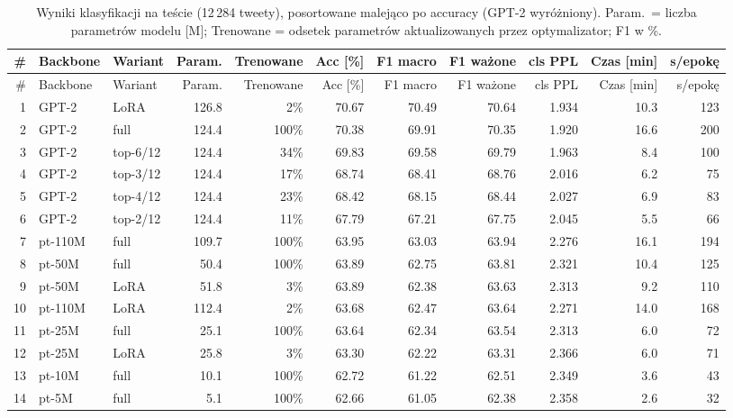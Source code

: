 {\footnotesize\setlength{\tabcolsep}{3.5pt}\setlength{\LTcapwidth}{\linewidth}
\begin{longtable}{@{}rllrrrrrrrr@{}}
\caption{Wyniki klasyfikacji na teście (12\,284 tweety), posortowane malejąco po accuracy (GPT-2 wyróżniony). Param.\ = liczba parametrów modelu [M]; Trenowane = odsetek parametrów aktualizowanych przez optymalizator; F1 w \%.}\label{tab:results}\\
\toprule
\# & Backbone & Wariant & Param. & Trenowane & Acc [\%] & F1 macro & F1 ważone & cls PPL & Czas [min] & s/epokę \\
\midrule
\endfirsthead
\toprule
\# & Backbone & Wariant & Param. & Trenowane & Acc [\%] & F1 macro & F1 ważone & cls PPL & Czas [min] & s/epokę \\
\midrule
\endhead
\bottomrule
\endlastfoot
\rowcolor{orange!12}1 & GPT-2 & LoRA & 126.8 & 2\% & 70.67 & 70.49 & 70.64 & 1.934 & 10.3 & 123 \\
\rowcolor{orange!12}2 & GPT-2 & full & 124.4 & 100\% & 70.38 & 69.91 & 70.35 & 1.920 & 16.6 & 200 \\
\rowcolor{orange!12}3 & GPT-2 & top-6/12 & 124.4 & 34\% & 69.83 & 69.58 & 69.79 & 1.963 & 8.4 & 100 \\
\rowcolor{orange!12}4 & GPT-2 & top-3/12 & 124.4 & 17\% & 68.74 & 68.41 & 68.76 & 2.016 & 6.2 & 75 \\
\rowcolor{orange!12}5 & GPT-2 & top-4/12 & 124.4 & 23\% & 68.42 & 68.15 & 68.44 & 2.027 & 6.9 & 83 \\
\rowcolor{orange!12}6 & GPT-2 & top-2/12 & 124.4 & 11\% & 67.79 & 67.21 & 67.75 & 2.045 & 5.5 & 66 \\
7 & pt-110M & full & 109.7 & 100\% & 63.95 & 63.03 & 63.94 & 2.276 & 16.1 & 194 \\
8 & pt-50M & full & 50.4 & 100\% & 63.89 & 62.75 & 63.81 & 2.321 & 10.4 & 125 \\
9 & pt-50M & LoRA & 51.8 & 3\% & 63.89 & 62.38 & 63.63 & 2.313 & 9.2 & 110 \\
10 & pt-110M & LoRA & 112.4 & 2\% & 63.68 & 62.47 & 63.64 & 2.271 & 14.0 & 168 \\
11 & pt-25M & full & 25.1 & 100\% & 63.64 & 62.34 & 63.54 & 2.313 & 6.0 & 72 \\
12 & pt-25M & LoRA & 25.8 & 3\% & 63.30 & 62.22 & 63.31 & 2.366 & 6.0 & 71 \\
13 & pt-10M & full & 10.1 & 100\% & 62.72 & 61.22 & 62.51 & 2.349 & 3.6 & 43 \\
14 & pt-5M & full & 5.1 & 100\% & 62.66 & 61.05 & 62.38 & 2.358 & 2.6 & 32 \\

\end{longtable}}

